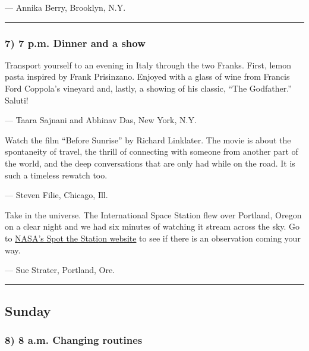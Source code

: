 --- Annika Berry, Brooklyn, N.Y.

\begin{center}\rule{0.5\linewidth}{\linethickness}\end{center}

\hypertarget{7-7-pm-dinner-and-a-show}{%
\subsubsection{\texorpdfstring{\textbf{7) 7 p.m. Dinner and a
show}}{7) 7 p.m. Dinner and a show}}\label{7-7-pm-dinner-and-a-show}}

Transport yourself to an evening in Italy through the two Franks. First,
lemon pasta inspired by Frank Prisinzano. Enjoyed with a glass of wine
from Francis Ford Coppola's vineyard and, lastly, a showing of his
classic, ``The Godfather.'' Saluti!

--- Taara Sajnani and Abhinav Das, New York, N.Y.

Watch the film ``Before Sunrise'' by Richard Linklater. The movie is
about the spontaneity of travel, the thrill of connecting with someone
from another part of the world, and the deep conversations that are only
had while on the road. It is such a timeless rewatch too.

--- Steven Filie, Chicago, Ill.

Take in the universe. The International Space Station flew over
Portland, Oregon on a clear night and we had six minutes of watching it
stream across the sky. Go to
\href{https://spotthestation.nasa.gov/sightings/}{NASA's Spot the
Station website} to see if there is an observation coming your way.

--- Sue Strater, Portland, Ore.

\begin{center}\rule{0.5\linewidth}{\linethickness}\end{center}

\hypertarget{sunday}{%
\subsection{Sunday}\label{sunday}}

\hypertarget{8-8-am-changing-routines}{%
\subsubsection{\texorpdfstring{\textbf{8) 8 a.m. Changing
routines}}{8) 8 a.m. Changing routines}}\label{8-8-am-changing-routines}}

